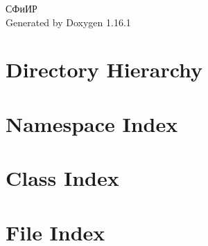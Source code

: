 \documentclass[twoside]{book}
\newcommand{\+}{\discretionary{\mbox{\scriptsize$\hookleftarrow$}}{}{}}
\newcommand{\clearemptydoublepage}{%
    \newpage{\pagestyle{empty}\cleardoublepage}%
  }
\begin{document}
  \raggedbottom
    \hypersetup{pageanchor=false,
                bookmarksnumbered=true,
                pdfencoding=unicode
               }
  \begin{titlepage}
  \vspace*{7cm}
  \begin{center}%
  {\Large СФиИР}\\
  \vspace*{1cm}
  {\large Generated by Doxygen 1.16.1}\\
  \end{center}
  \end{titlepage}
  \clearemptydoublepage
  \tableofcontents
  \clearemptydoublepage
  \hypersetup{pageanchor=true}
\chapter{Directory Hierarchy}

\chapter{Namespace Index}

\chapter{Class Index}

\chapter{File Index}

\end{document}
